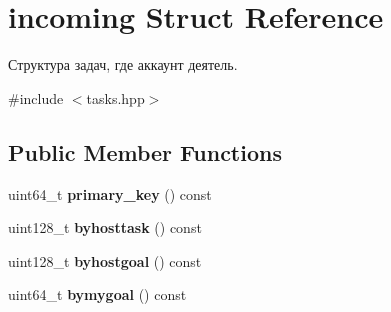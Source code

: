 \hypertarget{structincoming}{}\section{incoming Struct Reference}
\label{structincoming}


Структура задач, где аккаунт деятель.  




{\ttfamily \#include $<$tasks.\+hpp$>$}

\subsection*{Public Member Functions}
\begin{DoxyCompactItemize}
\item 
\mbox{\label{structincoming_ae9c10bc16472d43fb3ccb4d92ceafe09}} 
uint64\+\_\+t {\bfseries primary\+\_\+key} () const
\item 
\mbox{\label{structincoming_aa1299c15e18b2512be11f58769a5a5da}} 
uint128\+\_\+t {\bfseries byhosttask} () const
\item 
\mbox{\label{structincoming_ad317d70b568a875fa44fabff231421e9}} 
uint128\+\_\+t {\bfseries byhostgoal} () const
\item 
\mbox{\label{structincoming_a2e9ca9eb34ff5437c38d36fc4f98a7ec}} 
uint64\+\_\+t {\bfseries bymygoal} () const
\end{DoxyCompactItemize}
